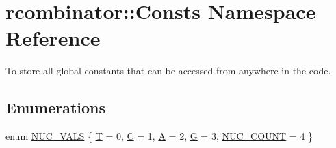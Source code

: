 \hypertarget{namespacercombinator_1_1Consts}{}\section{rcombinator\+:\+:Consts Namespace Reference}
\label{namespacercombinator_1_1Consts}


To store all global constants that can be accessed from anywhere in the code.  


\subsection*{Enumerations}
\begin{DoxyCompactItemize}
\item 
enum \mbox{\hyperlink{namespacercombinator_1_1Consts_aaa096a23d1bc2fdb1992265192fae907}{N\+U\+C\+\_\+\+V\+A\+LS}} \{ \newline
\mbox{\hyperlink{namespacercombinator_1_1Consts_aaa096a23d1bc2fdb1992265192fae907a28700244abb5c707ccefb9bde756e436}{T}} = 0, 
\mbox{\hyperlink{namespacercombinator_1_1Consts_aaa096a23d1bc2fdb1992265192fae907af522785f2f571764ccee708d2fe93095}{C}} = 1, 
\mbox{\hyperlink{namespacercombinator_1_1Consts_aaa096a23d1bc2fdb1992265192fae907aca9ee451a44f492976f6b64caef761a1}{A}} = 2, 
\mbox{\hyperlink{namespacercombinator_1_1Consts_aaa096a23d1bc2fdb1992265192fae907a5020e318d196247b860e9fe541f74d33}{G}} = 3, 
\newline
\mbox{\hyperlink{namespacercombinator_1_1Consts_aaa096a23d1bc2fdb1992265192fae907aa51005e405016569840eefdd20caf39b}{N\+U\+C\+\_\+\+C\+O\+U\+NT}} = 4
 \}
\end{DoxyCompactItemize}
